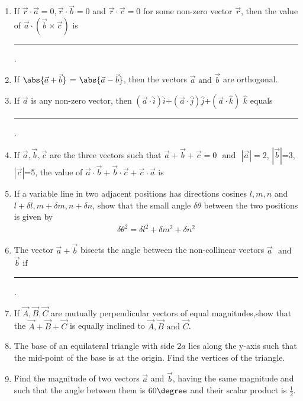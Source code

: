 \begin{enumerate}[label=\thesubsection.\arabic*,ref=\thesubsection.\theenumi]
\item If $\vec{r}\cdot\vec{a}=0, \vec{r}\cdot\vec{b}=0$ and $\vec{r}\cdot\vec{c}=0$ for some non-zero vector $\vec{r}$, then the value of $\vec{a}\cdot(\vec{b}\times\vec{c})$ is \rule{1cm}{0.15mm}.
\item If $\abs{\vec{a}+\vec{b}}$ = $\abs{\vec{a}-\vec{b}}$, then the vectors $\vec{a}$ $\text {and}$ $\vec{b}$ are orthogonal.
\item If $\vec{a}$ is  any non-zero vector, then $(\vec{a}\cdot \hat{i})\hat{i}$+$(\vec{a}\cdot \hat{j})\hat{j}$+$(\vec{a}\cdot \hat{k})$ $\hat{k}$ equals \rule{1cm}{0.15mm}.
\item If $\vec{a},\vec{b},\vec{c}$ are the three vectors such that $\vec{a}+\vec{b}+\vec{c}=0$ $\text{ and }$ $|\vec{a}|=2$, $|\vec{b}|$=3, $|\vec{c}|$=5, the value of $\vec{a} \cdot \vec{b}+\vec{b} \cdot \vec{c}+\vec{c} \cdot \vec{a}$ is
\item If a variable line in two adjacent positions has directions cosines $l, m, n$ and $l+\delta l, m+\delta m, n+\delta n$, show that the small angle $\delta\theta$ between the two positions is given by 
\begin{align}
	\delta\theta^2=\delta l^2+\delta m^2+\delta n^2
\end{align}
\item The vector $\vec{a}+\vec{b}$ bisects the angle between the non-collinear vectors $\vec{a}$ $\text{ and }$ $\vec{b}$ if \rule{1cm}{0.15mm}.
    \item If $ \vec{A},\vec{B},\vec{C} $ are mutually perpendicular vectors of equal magnitudes,show that the  $ \vec{A}+\vec{B}+\vec{C} $ is equally inclined to $ \vec{A},\vec{B}  \text{ and }  \vec{C} $.
\item The base of an equilateral triangle with side $2a$ lies along the y-axis such that the mid-point of the base is at the origin. Find the vertices of the triangle.
\label{chapters/11/10/1/2}
	\\
	\solution 

\item Find the magnitude of two vectors $\overrightarrow {a}$ and $\overrightarrow {b}$, having the same magnitude and such that the angle between them is $60\degree$ and their scalar product is $\frac{1}{2}$.
	\\

\end{enumerate}
